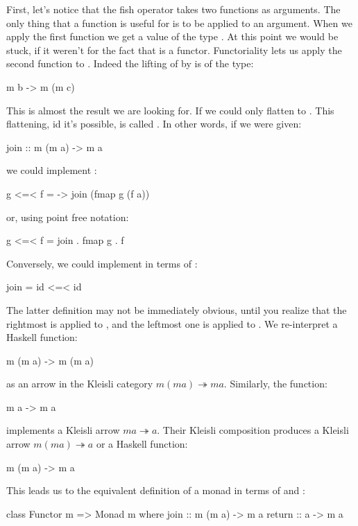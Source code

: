 \documentclass[DaoFP]{subfiles}
\begin{document}
First, let's notice that the fish operator takes two functions as arguments. The only thing that a function is useful for is to be applied to an argument. When we apply the first function  we get a value of the type . At this point we would be stuck, if it weren't for the fact that  is a functor. Functoriality lets us apply the second function  to . Indeed the lifting of  by  is of the type:
\begin{haskell}
m b -> m (m c)
\end{haskell}
This is almost the result we are looking for. If we could only flatten  to . This flattening, id it's possible, is called . In other words, if we were given:
\begin{haskell}
join ::  m (m a) -> m a
\end{haskell}
we could implement \hask{<=<}:
\begin{haskell}
g <=< f = \a -> join (fmap g (f a))
\end{haskell}
or, using point free notation:
\begin{haskell}
g <=< f = join . fmap g . f
\end{haskell}

Conversely, we could implement  in terms of \hask{<=<}:
\begin{haskell}
join = id <=< id
\end{haskell}
The latter definition may not be immediately obvious, until you realize that the rightmost  is applied to , and the leftmost one is applied to . We re-interpret a Haskell function:
\begin{haskell}
m (m a) -> m (m a)
\end{haskell}
as an arrow in the Kleisli category $ m (m a) \twoheadrightarrow m a$. Similarly, the function:
\begin{haskell}
m a -> m a
\end{haskell}
implements a Kleisli arrow $m a \twoheadrightarrow a$. Their Kleisli composition produces a Kleisli arrow $m (m a) \twoheadrightarrow a$ or a Haskell function:
\begin{haskell}
m (m a) -> m a
\end{haskell}

This leads us to the equivalent definition of a monad in terms of  and :
\begin{haskell}
class Functor m => Monad m where
  join :: m (m a) -> m a
  return :: a -> m a
\end{haskell}
\end{document}
